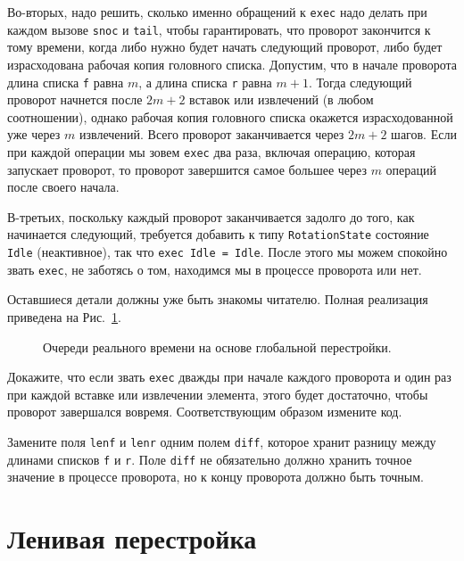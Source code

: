 Во-вторых, надо решить, сколько именно обращений к \lstinline!exec!
надо делать при каждом вызове \lstinline!snoc! и \lstinline!tail!,
чтобы гарантировать, что проворот закончится к тому времени, когда либо
нужно будет начать следующий проворот, либо будет израсходована рабочая
копия головного списка.  Допустим, что в начале проворота длина списка
\lstinline!f! равна $m$, а длина списка \lstinline!r! равна
$m+1$. Тогда следующий проворот начнется после $2m+2$ вставок или
извлечений (в любом соотношении), однако рабочая копия головного
списка окажется израсходованной уже через $m$ извлечений. Всего
проворот заканчивается через $2m+2$ шагов. Если при каждой операции мы
зовем \lstinline!exec! два раза, включая операцию, которая запускает
проворот, то проворот завершится самое большее через $m$ операций после
своего начала.

В-третьих, поскольку каждый проворот заканчивается задолго до того, как
начинается следующий, требуется добавить к типу
\lstinline!RotationState! состояние \lstinline!Idle! (неактивное), так
что \lstinline!exec Idle = Idle!. После этого мы можем спокойно звать
\lstinline!exec!, не заботясь о том, находимся мы в процессе проворота
или нет.

Оставшиеся детали должны уже быть знакомы читателю. Полная реализация
приведена на Рис.~\ref{fig:8.1}.

\begin{figure}
  \centering

  \caption{Очереди реального времени на основе глобальной перестройки.}
  \label{fig:8.1}
\end{figure}

\begin{exercise}\label{ex:8.2}
  Докажите, что если звать \lstinline!exec! дважды при начале
  каждого проворота и один раз при каждой вставке или извлечении
  элемента, этого будет достаточно, чтобы проворот завершался
  вовремя. Соответствующим образом измените код.
\end{exercise}

\begin{exercise}\label{ex:8.3}
  Замените поля \lstinline!lenf! и \lstinline!lenr! одним полем
  \lstinline!diff!, которое хранит разницу между длинами списков
  \lstinline!f! и \lstinline!r!. Поле \lstinline!diff! не обязательно
  должно хранить точное значение в процессе проворота, но к концу проворота
  должно быть точным.
\end{exercise}

\section{Ленивая перестройка}
\label{sc:8.3}

